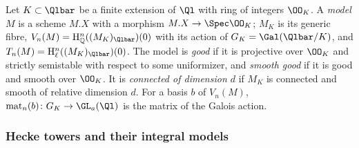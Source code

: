 \begin{definition}[Models]\label{pf:steps1:def:model}
Let $K\subset\Qlbar$ be a finite extension of $\Ql$ with ring of integers $\OO_K$. A \emph{model} $M$
is a scheme $M.X$ with a morphism $M.X\to\Spec\OO_K$; $M_K$ is its generic fibre,
$V_n(M)=\stepsIHQ^n((M_K)_{\Qlbar})(0)$ with its action of $G_K=\Gal(\Qlbar/K)$, and
$T_n(M)=\stepsIHl^n((M_K)_{\Qlbar})(0)$. The model is \emph{good} if it is projective over $\OO_K$ and
strictly semistable with respect to some uniformizer, and \emph{smooth good} if it is good and smooth
over $\OO_K$. It is \emph{connected of dimension $d$} if $M_K$ is connected and smooth of relative
dimension $d$. For a basis $b$ of $V_n(M)$, $\mathrm{mat}_n(b)\colon G_K\to\GL_a(\Ql)$ is the matrix of
the Galois action. 
\end{definition}

\subsubsection{Hecke towers and their integral models}\label{sec:pf:steps1:conv:towers}

